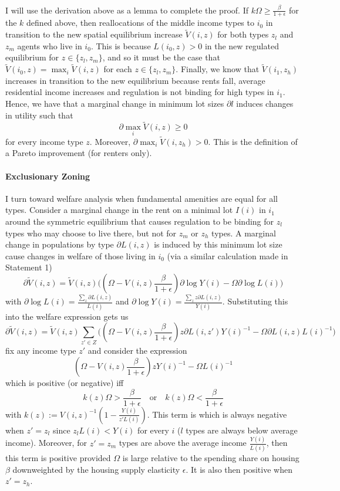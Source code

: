 \documentclass[12pt]{article}
\begin{document}
	\paragraph*{}
	I will use the derivation above as a lemma to complete the proof. If  $k\Omega \geq \frac{\beta}{1 + \epsilon}$ for the $k$ defined above, then reallocations of the middle income types to $i_{0}$ in transition to the new spatial equilibrium increase $\tilde{V}(i, z)$ for both types $z_{l}$ and $z_{m}$ agents who live in $i_{0}$. This is because $L(i_{0}, z) > 0$ in the new regulated equilibrium for $z \in \{z_{l}, z_{m}\}$, and so it must be the case that $\tilde{V}(i_{0}, z) = \max_{i}\tilde{V}(i, z)$ for each $z \in \{z_{l}, z_{m}\}$. Finally, we know that $\tilde{V}(i_{1}, z_{h})$ increases in transition to the new equilibrium because rents fall, average residential income increases and regulation is not binding for high types in $i_{1}$. Hence, we have that a marginal change in minimum lot sizes $\partial l$ induces changes in utility such that $$\partial \max_{i}\tilde{V}(i, z) \geq 0$$ for every income type $z$. Moreover, $\partial \max_{i}\tilde{V}(i, z_{h}) > 0$. This is the definition of a Pareto improvement (for renters only). 
	
	\paragraph*{Exclusionary Zoning} I turn toward welfare analysis when fundamental amenities are equal for all types. Consider a marginal change in the rent on a minimal lot $I(i)$ in $i_{1}$ around the symmetric equilibrium that causes regulation to be binding for $z_{l}$ types who may choose to live there, but not for $z_{m}$ or $z_{h}$ types. A marginal change in populations by type $\partial L(i, z)$ is induced by this minimum lot size cause changes in welfare of those living in $i_{0}$ (via a similar calculation made in Statement 1) 
	$$\partial \tilde{V}(i, z) = \tilde{V}(i, z)\bigg( (\Omega - V(i, z)\frac{\beta}{1 + \epsilon}) \partial \log Y(i) - \Omega \partial \log L(i)  \bigg) $$ with  $\partial \log L(i) = \frac{\sum_{z} \partial L(i, z)}{L(i)}$ and $\partial \log Y(i) = \frac{\sum_{z}z\partial L(i, z)}{Y(i)}$. Substituting this into the welfare expression gets us 
	$$\partial \tilde{V}(i, z) = \tilde{V}(i, z)\sum_{z' \in Z}\bigg( (\Omega - V(i, z)\frac{\beta}{1 + \epsilon})z\partial L(i, z')Y(i)^{-1} - \Omega \partial L(i, z)L(i)^{-1}   \bigg) $$
	fix any income type $z'$ and consider the expression $$(\Omega - V(i, z)\frac{\beta}{1 + \epsilon})zY(i)^{-1} - \Omega L(i)^{-1}$$
	which is positive (or negative) iff $$k(z)\Omega > \frac{\beta}{1 + \epsilon} \quad \text{or} \quad k(z)\Omega <\frac{\beta}{1 + \epsilon} $$
	with $k(z) := V(i, z)^{-1}(1 - \frac{Y(i)}{z'L(i)})$. This term is which is always negative when $z' = z_{l}$ since $z_{l}L(i) < Y(i)$ for every $i$ ($l$ types are always below average income). Moreover, for $z' = z_{m}$ types are above the average income $\frac{Y(i)}{L(i)}$, then this term is positive provided $\Omega$ is large relative to the spending share on housing $\beta$ downweighted by the housing supply elasticity $\epsilon$. It is also then positive when $z' = z_{h}$. 
\end{document}
